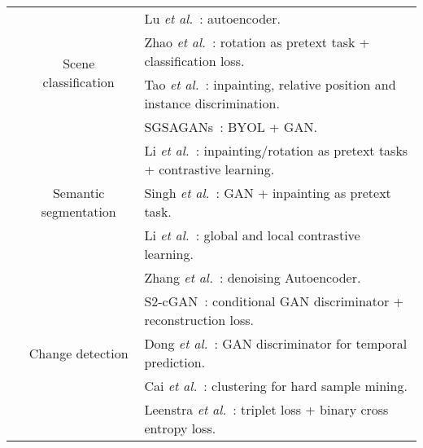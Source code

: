 \documentclass[lettersize,journal]{IEEEtran}
\newcommand{\etal}{\textit{et al.}}
\begin{document}
\begin{table*}
{\begin{tabular}{|c|c|l|}
                                 & \multirow{4}{*}{Scene classification}         & Lu \etal~\cite{lu2017remote}: autoencoder.                                                      \\
                                 &                                               & Zhao \etal~\cite{zhao2020self}: rotation as pretext task + classification loss.                 \\
                                 &                                               & Tao \etal~\cite{tao2020remote}: inpainting, relative position and instance discrimination.      \\
                                 &                                               & SGSAGANs~\cite{guo2021self}: BYOL + GAN.                                                        \\ \cline{2-3} 
                                 & \multirow{3}{*}{Semantic segmentation}        & Li \etal~\cite{li2021semantic}: inpainting/rotation as pretext tasks + contrastive learning.    \\
                                 &                                               & Singh \etal~\cite{singh2018self}: GAN + inpainting as pretext task.                             \\
                                 &                                               & Li \etal~\cite{li2021remote}: global and local contrastive learning.                            \\ \cline{2-3} 
                                 & \multirow{6}{*}{Change detection}             & Zhang \etal~\cite{zhang2016change}: denoising Autoencoder.                                      \\
                                 &                                               & S2-cGAN~\cite{alvarez2020s2}: conditional GAN discriminator + reconstruction loss.              \\
                                 &                                               & Dong \etal~\cite{dong2020self}: GAN discriminator for temporal prediction.                      \\
                                 &                                               & Cai \etal~\cite{cai2021task}: clustering for hard sample mining.                                \\
                                 &                                               & Leenstra \etal~\cite{leenstra2021self}: triplet loss + binary cross entropy loss.               \\

\end{tabular}}
\end{table*}
\end{document}

